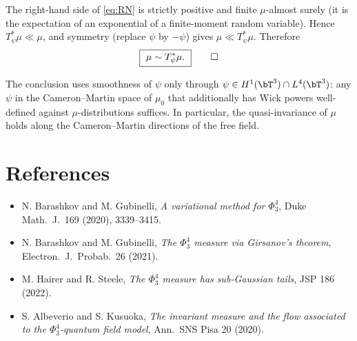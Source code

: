 The right-hand side of \eqref{eq:RN} is strictly positive and finite $\mu$-almost surely (it is the expectation of an exponential of a finite-moment random variable). Hence $T_\psi^*\mu \ll \mu$, and symmetry (replace $\psi$ by $-\psi$) gives $\mu \ll T_\psi^*\mu$. Therefore
\[
   \boxed{\ \mu \sim T_\psi^*\mu.\ }\qedhere
\]

\begin{proposition}
The conclusion uses smoothness of $\psi$ only through $\psi \in H^1(\bT^3) \cap L^4(\bT^3)$: any $\psi$ in the Cameron--Martin space of $\mu_0$ that additionally has Wick powers well-defined against $\mu$-distributions suffices. In particular, the quasi-invariance of $\mu$ holds along the Cameron--Martin directions of the free field.
\end{proposition}

\section*{References}

\begin{itemize}\setlength\itemsep{0.2em}
\item N. Barashkov and M. Gubinelli, \emph{A variational method for $\Phi^4_3$}, Duke Math.\ J.\ 169 (2020), 3339--3415.
\item N. Barashkov and M. Gubinelli, \emph{The $\Phi^4_3$ measure via Girsanov's theorem}, Electron.\ J.\ Probab.\ 26 (2021).
\item M. Hairer and R. Steele, \emph{The $\Phi^4_3$ measure has sub-Gaussian tails}, JSP 186 (2022).
\item S. Albeverio and S. Kusuoka, \emph{The invariant measure and the flow associated to the $\Phi^4_3$-quantum field model}, Ann.\ SNS Pisa 20 (2020).
\end{itemize}


